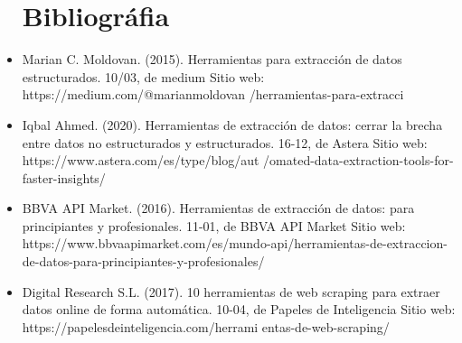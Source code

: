 \documentclass[twoside,twocolumn]{article}
\begin{document}
\begin{itemize}
\section{Bibliográfia}
\item Marian C. Moldovan. (2015). Herramientas para extracción de datos estructurados. 10/03, de medium Sitio web: https://medium.com/@marianmoldovan
\newline/herramientas-para-extracci%
\newline
\newline
\item Iqbal Ahmed. (2020). Herramientas de extracción de datos: cerrar la brecha entre datos no estructurados y estructurados. 16-12, de Astera Sitio web: https://www.astera.com/es/type/blog/aut
\newline/omated-data-extraction-tools-for-faster-insights/
\newline
\newline
\item BBVA API Market. (2016). Herramientas de extracción de datos: para principiantes y profesionales. 11-01, de BBVA API Market Sitio web: https://www.bbvaapimarket.com/es/mundo-api/herramientas-de-extraccion-de-datos-para-principiantes-y-profesionales/
\newline
\newline

\item Digital Research S.L. (2017). 10 herramientas de web scraping para extraer datos online de forma automática. 10-04, de Papeles de Inteligencia Sitio web: https://papelesdeinteligencia.com/herrami
\newline entas-de-web-scraping/
\newline
\newline






\end{itemize}
\end{document}
